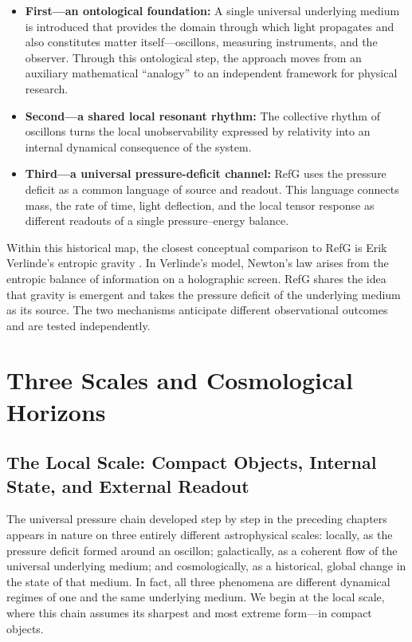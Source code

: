 \documentclass[11pt,a4paper]{article}
\begin{document}
\begin{itemize}
\item \textbf{First---an ontological foundation:} A single universal underlying medium is introduced that provides the domain through which light propagates and also constitutes matter itself---oscillons, measuring instruments, and the observer. Through this ontological step, the approach moves from an auxiliary mathematical ``analogy'' to an independent framework for physical research.
\item \textbf{Second---a shared local resonant rhythm:} The collective rhythm of oscillons turns the local unobservability expressed by relativity into an internal dynamical consequence of the system.
\item \textbf{Third---a universal pressure-deficit channel:} RefG uses the pressure deficit as a common language of source and readout. This language connects mass, the rate of time, light deflection, and the local tensor response as different readouts of a single pressure--energy balance.
\end{itemize}

Within this historical map, the closest conceptual comparison to RefG is Erik Verlinde's entropic gravity \citep{verlinde2011}. In Verlinde's model, Newton's law arises from the entropic balance of information on a holographic screen. RefG shares the idea that gravity is emergent and takes the pressure deficit of the underlying medium as its source. The two mechanisms anticipate different observational outcomes and are tested independently.

\section{Three Scales and Cosmological Horizons}

\subsection{The Local Scale: Compact Objects, Internal State, and External Readout}

The universal pressure chain developed step by step in the preceding chapters appears in nature on three entirely different astrophysical scales: locally, as the pressure deficit formed around an oscillon; galactically, as a coherent flow of the universal underlying medium; and cosmologically, as a historical, global change in the state of that medium. In fact, all three phenomena are different dynamical regimes of one and the same underlying medium. We begin at the local scale, where this chain assumes its sharpest and most extreme form---in compact objects.
\end{document}

